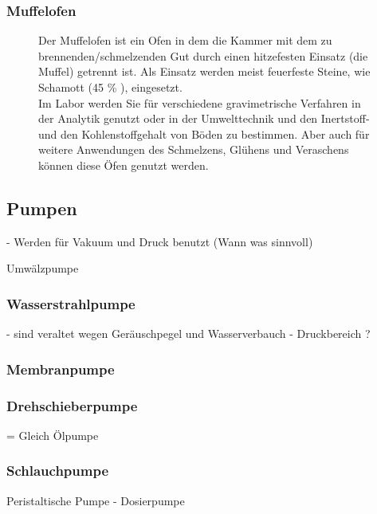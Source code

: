 \subsubsection*{Muffelofen}
\begin{figure}[h!]
	\begin{minipage}[t]{0.65\textwidth}
		\vspace{0pt}
		Der Muffelofen ist ein Ofen in dem die Kammer mit dem zu brennenden/schmelzenden Gut durch einen hitzefesten Einsatz (die Muffel) getrennt ist. Als Einsatz werden meist feuerfeste Steine, wie Schamott (45 \% ), eingesetzt.\\
		Im Labor werden Sie für verschiedene gravimetrische Verfahren in der Analytik genutzt oder in der Umwelttechnik und den Inertstoff- und den Kohlenstoffgehalt von Böden zu bestimmen. Aber auch für weitere Anwendungen des Schmelzens, Glühens und Veraschens können diese Öfen genutzt werden.
	\end{minipage}
	\hfill
	\hspace{1mm}
	\begin{minipage}[t]{0.3\textwidth}
	\end{minipage}
\end{figure}
\FloatBarrier

\subsection{Pumpen}
- Werden für Vakuum und Druck benutzt (Wann was sinnvoll)

Umwälzpumpe

\subsubsection*{Wasserstrahlpumpe}
- sind veraltet wegen Geräuschpegel und Wasserverbauch
- Druckbereich ?

\subsubsection*{Membranpumpe}
\subsubsection*{Drehschieberpumpe}
= Gleich Ölpumpe

\subsubsection{Schlauchpumpe}
Peristaltische Pumpe - Dosierpumpe

